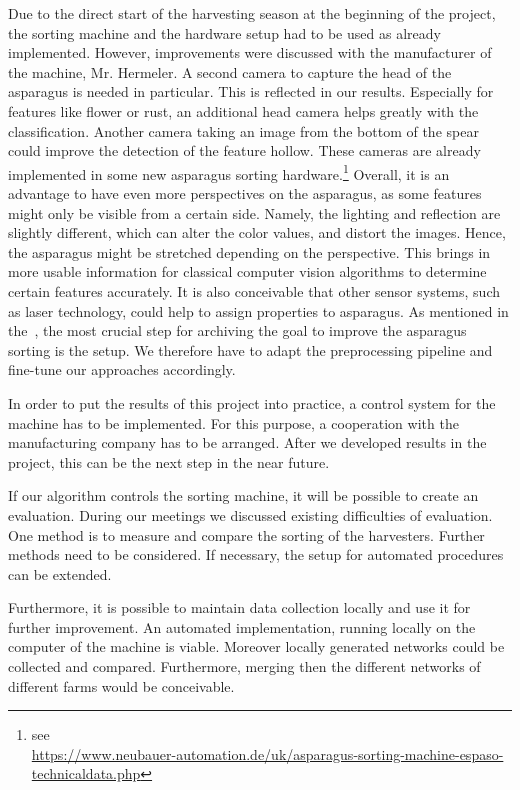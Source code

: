 \bigskip
Due to the direct start of the harvesting season at the beginning of the project, the sorting machine and the hardware setup had to be used as already implemented. However, improvements were discussed with the manufacturer of the machine, Mr. Hermeler. A second camera to capture the head of the asparagus is needed in particular. This is reflected in our results. Especially for features like flower or rust, an additional head camera helps greatly with the classification. Another camera taking an image from the bottom of the spear could improve the detection of the feature hollow. These cameras are already implemented in some new asparagus sorting hardware.\footnote{see \\ \url{https://www.neubauer-automation.de/uk/asparagus-sorting-machine-espaso-technicaldata.php}}
Overall, it is an advantage to have even more perspectives on the asparagus, as some features might only be visible from a certain side. Namely, the lighting and reflection are slightly different, which can alter the color values, and distort the images. Hence, the asparagus might be stretched depending on the perspective. This brings in more usable information for classical computer vision algorithms to determine certain features accurately. 
It is also conceivable that other sensor systems, such as laser technology, could help to assign properties to asparagus. As mentioned in the~, the most crucial step for archiving the goal to improve the asparagus sorting is the setup. We therefore have to adapt the preprocessing pipeline and fine-tune our approaches accordingly.

In order to put the results of this project into practice, a control system for the machine has to be implemented. For this purpose, a cooperation with the manufacturing company has to be arranged. After we developed results in the project, this can be the next step in the near future.

If our algorithm controls the sorting machine, it will be possible to create an evaluation. During our meetings we discussed existing difficulties of evaluation. One method is to measure and compare the sorting of the harvesters. Further methods need to be considered. If necessary, the setup for automated procedures can be extended.

Furthermore, it is possible to maintain data collection locally and use it for further improvement. An automated implementation, running locally on the computer of the machine is viable. Moreover locally generated networks could be collected and compared. Furthermore, merging then the different networks of different farms would be conceivable.


